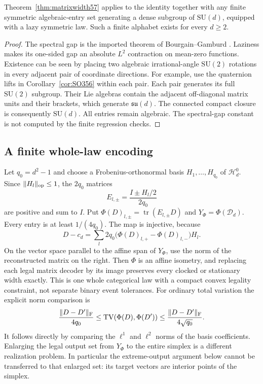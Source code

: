 \begin{corollary}\label{cor:algebraicunitary57}
Theorem~\ref{thm:matrixwidth57} applies to the identity together with any finite symmetric algebraic-entry set generating a dense subgroup of $\mathrm{SU}(d)$, equipped with a lazy symmetric law. Such a finite alphabet exists for every $d\ge2$.
\end{corollary}
\begin{proof}
The spectral gap is the imported theorem of Bourgain--Gamburd \cite{BG2012}. Laziness makes its one-sided gap an absolute $L^2$ contraction on mean-zero functions. Existence can be seen by placing two algebraic irrational-angle $\mathrm{SU}(2)$ rotations in every adjacent pair of coordinate directions. For example, use the quaternion lifts in Corollary~\ref{cor:SO356} within each pair. Each pair generates its full $\mathrm{SU}(2)$ subgroup. Their Lie algebras contain the adjacent off-diagonal matrix units and their brackets, which generate $\mathfrak{su}(d)$. The connected compact closure is consequently $\mathrm{SU}(d)$. All entries remain algebraic. The spectral-gap constant is not computed by the finite regression checks.
\end{proof}

\subsection{A finite whole-law encoding}
Let $q_0=d^2-1$ and choose a Frobenius-orthonormal basis $H_1,\ldots,H_{q_0}$ of $\mathcal H_d^0$. Since $\|H_l\|_{\rm op}\le1$, the $2q_0$ matrices
\[
 E_{l,\pm}=\frac{I\pm H_l/2}{2q_0}
\]
are positive and sum to $I$. Put $\Phi(D)_{l,\pm}=\operatorname{tr}(E_{l,\pm}D)$ and $Y_\Phi=\Phi(\mathcal D_d)$. Every entry is at least $1/(4q_0)$. The map is injective, because
\begin{equation}\label{eq:tomography57}
 D-c_d=\sum_l2q_0\bigl(\Phi(D)_{l,+}-\Phi(D)_{l,-}\bigr)H_l.
\end{equation}
On the vector space parallel to the affine span of $Y_\Phi$, use the norm of the reconstructed matrix on the right. Then $\Phi$ is an affine isometry, and replacing each legal matrix decoder by its image preserves every clocked or stationary width exactly. This is one whole categorical law with a compact convex legality constraint, not separate binary event tolerances. For ordinary total variation the explicit norm comparison is
\[
 \frac{\|D-D'\|_{\rm F}}{4q_0}
 \le\operatorname{TV}(\Phi(D),\Phi(D'))
 \le\frac{\|D-D'\|_{\rm F}}{4\sqrt{q_0}}.
\]
It follows directly by comparing the $\ell^1$ and $\ell^2$ norms of the basis coefficients. Enlarging the legal output set from $Y_\Phi$ to the entire simplex is a different realization problem. In particular the extreme-output argument below cannot be transferred to that enlarged set: its target vectors are interior points of the simplex.
